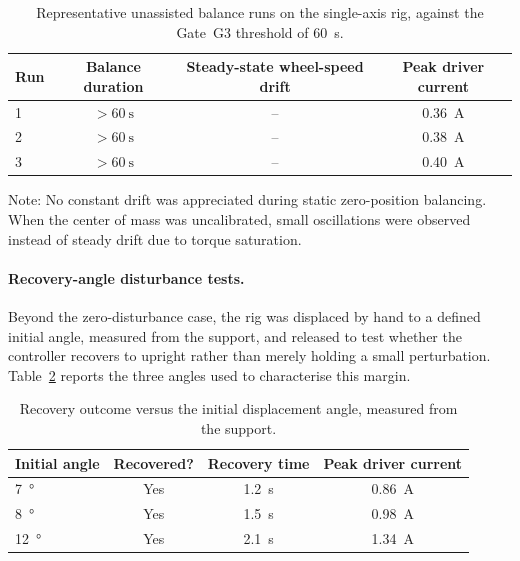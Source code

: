 \begin{table}[htbp]
\centering
\caption[1-DoF unassisted balance examples]{Representative unassisted balance
runs on the single-axis rig, against the Gate~G3 threshold of
\qty{60}{\second}.}
\label{tab:balance_examples}
\begin{tabular}{lccc}
\toprule
Run & Balance duration & Steady-state wheel-speed drift & Peak driver current \\
\midrule
1 & $> \qty{60}{\second}$ & -- & \qty{0.36}{\ampere} \\
2 & $> \qty{60}{\second}$ & -- & \qty{0.38}{\ampere} \\
3 & $> \qty{60}{\second}$ & -- & \qty{0.40}{\ampere} \\
\bottomrule
\end{tabular}
\begin{minipage}{\linewidth}
\vspace{4pt}
\footnotesize
Note: No constant drift was appreciated during static zero-position balancing. When the center of mass was uncalibrated, small oscillations were observed instead of steady drift due to torque saturation.
\end{minipage}
\end{table}

\paragraph{Recovery-angle disturbance tests.} Beyond the zero-disturbance case,
the rig was displaced by hand to a defined initial angle, measured from the
support, and released to test whether the controller recovers to upright
rather than merely holding a small perturbation. Table~\ref{tab:recovery_angle}
reports the three angles used to characterise this margin.

\begin{table}[htbp]
\centering
\caption[Recovery from a defined initial angle]{Recovery outcome versus the
initial displacement angle, measured from the support.}
\label{tab:recovery_angle}
\begin{tabular}{lccc}
\toprule
Initial angle & Recovered? & Recovery time & Peak driver current \\
\midrule
\qty{7}{\degree}  & Yes & \qty{1.2}{\second} & \qty{0.86}{\ampere} \\
\qty{8}{\degree}  & Yes & \qty{1.5}{\second} & \qty{0.98}{\ampere} \\
\qty{12}{\degree} & Yes & \qty{2.1}{\second} & \qty{1.34}{\ampere} \\
\bottomrule
\end{tabular}
\end{table}

